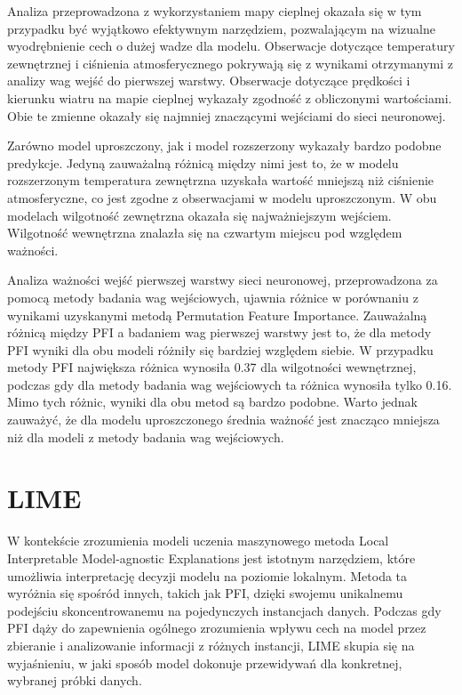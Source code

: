 \documentclass[a4paper,twoside,12pt]{book}
\begin{document}
Analiza przeprowadzona z wykorzystaniem mapy cieplnej okazała się w tym przypadku być wyjątkowo efektywnym narzędziem, pozwalającym na wizualne wyodrębnienie cech o dużej wadze dla modelu. Obserwacje dotyczące temperatury zewnętrznej i ciśnienia atmosferycznego pokrywają się z wynikami otrzymanymi z analizy wag wejść do pierwszej warstwy. Obserwacje dotyczące prędkości i kierunku wiatru na mapie cieplnej wykazały zgodność z obliczonymi wartościami. Obie te zmienne okazały się najmniej znaczącymi wejściami do sieci neuronowej.

Zarówno model uproszczony, jak i model rozszerzony wykazały bardzo podobne predykcje. Jedyną zauważalną różnicą między nimi jest to, że w modelu rozszerzonym temperatura zewnętrzna uzyskała wartość mniejszą niż ciśnienie atmosferyczne, co jest zgodne z obserwacjami w modelu uproszczonym. W obu modelach wilgotność zewnętrzna okazała się najważniejszym wejściem. Wilgotność wewnętrzna znalazła się na czwartym miejscu pod względem ważności.

Analiza ważności wejść pierwszej warstwy sieci neuronowej, przeprowadzona za pomocą metody badania wag wejściowych, ujawnia różnice w porównaniu z wynikami uzyskanymi metodą Permutation Feature Importance. Zauważalną różnicą między PFI a badaniem wag pierwszej warstwy jest to, że dla metody PFI wyniki dla obu modeli różniły się bardziej względem siebie. W przypadku metody PFI największa różnica wynosiła 0.37 dla wilgotności wewnętrznej, podczas gdy dla metody badania wag wejściowych ta różnica wynosiła tylko 0.16. Mimo tych różnic, wyniki dla obu metod są bardzo podobne. Warto jednak zauważyć, że dla modelu uproszczonego średnia ważność jest znacząco mniejsza niż dla modeli z metody badania wag wejściowych.

\newpage
\section{LIME}
W kontekście zrozumienia modeli uczenia maszynowego metoda Local Interpretable Model-agnostic Explanations jest istotnym narzędziem, które umożliwia interpretację decyzji modelu na poziomie lokalnym. Metoda ta wyróżnia się spośród innych, takich jak PFI, dzięki swojemu unikalnemu podejściu skoncentrowanemu na pojedynczych instancjach danych. Podczas gdy PFI dąży do zapewnienia ogólnego zrozumienia wpływu cech na model przez zbieranie i analizowanie informacji z różnych instancji, LIME skupia się na wyjaśnieniu, w jaki sposób model dokonuje przewidywań dla konkretnej, wybranej próbki danych.
\end{document}
